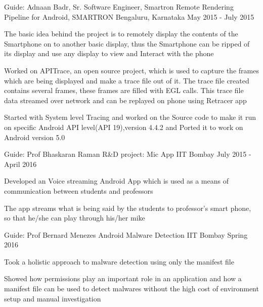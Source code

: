 \begin{cventries}
  \cventry
    {Guide: Adnaan Badr, Sr. Software Engineer, Smartron}
    {Remote Rendering Pipeline for Android, SMARTRON}
    {Bengaluru, Karnataka}
    {May 2015 - July 2015}
    {
      \begin{cvitems}
        \item {The basic idea behind the project is to remotely display the contents of the Smartphone on to another
            basic display, thus the Smartphone can be ripped of its display and use any display to view and Interact
            with the phone}
        \item {Worked on APITrace, an open source project, which is used to capture the frames which are being
               displayed and make a trace file out of it. The trace file created contains several frames, these frames are
               filled with EGL calls. This trace file data streamed over network and can be replayed on phone using
                Retracer app}
        \item {Started with System level Tracing and worked on the Source code to make it run on specific Android API
                level(API 19),version 4.4.2 and Ported it to work on Android version 5.0}
      \end{cvitems}
    }
    
    
    
    
  \cventry
    {Guide: Prof Bhaskaran Raman}
    {R\&D project: Mic App}
    {IIT Bombay}
    {July 2015 - April 2016}
    {
      \begin{cvitems}
        \item {Developed an Voice streaming Android App which is used as a means of communication between students and professors}
        \item {The app streams what is being said by the students to professor’s smart phone, so that he/she can play
                through his/her mike}
      \end{cvitems}
    }
    
     \cventry
    {Guide: Prof Bernard Menezes}
    {Android Malware Detection}
    {IIT Bombay}
    {Spring 2016}
    {
      \begin{cvitems}
        \item {Took a holistic approach to malware detection using only the manifest file}
        \item{Showed how permissions play an important role in an application and how a manifest file can be used to detect malwares without the high cost of environment setup and manual investigation}
      \end{cvitems}
    }
    

\end{cventries}
